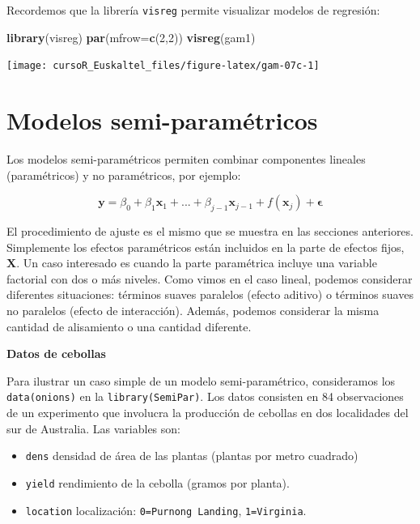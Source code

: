 \documentclass[]{book}
\newenvironment{Shaded}{\begin{snugshade}}{\end{snugshade}}
\newcommand{\KeywordTok}[1]{\textcolor[rgb]{0.13,0.29,0.53}{\textbf{#1}}}
\newcommand{\DataTypeTok}[1]{\textcolor[rgb]{0.13,0.29,0.53}{#1}}
\newcommand{\DecValTok}[1]{\textcolor[rgb]{0.00,0.00,0.81}{#1}}
\newcommand{\NormalTok}[1]{#1}
\begin{document}
Recordemos que la librería \texttt{visreg} permite visualizar modelos de
regresión:

\begin{Shaded}
\begin{Highlighting}[]
\KeywordTok{library}\NormalTok{(visreg)}
\KeywordTok{par}\NormalTok{(}\DataTypeTok{mfrow=}\KeywordTok{c}\NormalTok{(}\DecValTok{2}\NormalTok{,}\DecValTok{2}\NormalTok{))}
\KeywordTok{visreg}\NormalTok{(gam1)}
\end{Highlighting}
\end{Shaded}

\begin{center}\texttt{[image: cursoR\_Euskaltel\_files/figure-latex/gam-07c-1]} \end{center}

\section{Modelos semi-paramétricos}\label{modelos-semi-parametricos}

Los modelos semi-paramétricos permiten combinar componentes lineales
(paramétricos) y no paramétricos, por ejemplo:

\[
\boldsymbol{y} = \beta_0 + \beta_1\boldsymbol{x}_1 + ... + \beta_{j-1}\boldsymbol{x}_{j-1} + f(\boldsymbol{x}_j) + \boldsymbol{\epsilon}
\]

El procedimiento de ajuste es el mismo que se muestra en las secciones
anteriores. Simplemente los efectos paramétricos están incluidos en la
parte de efectos fijos, \(\boldsymbol{X}\). Un caso interesado es cuando
la parte paramétrica incluye una variable factorial con dos o más
niveles. Como vimos en el caso lineal, podemos considerar diferentes
situaciones: términos suaves paralelos (efecto aditivo) o términos
suaves no paralelos (efecto de interacción). Además, podemos considerar
la misma cantidad de alisamiento o una cantidad diferente.

\textbf{Datos de cebollas}

Para ilustrar un caso simple de un modelo semi-paramétrico, consideramos
los \texttt{data(onions)} en la \texttt{library(SemiPar)}. Los datos
consisten en 84 observaciones de un experimento que involucra la
producción de cebollas en dos localidades del sur de Australia. Las
variables son:

\begin{itemize}
\item
  \texttt{dens} densidad de área de las plantas (plantas por metro
  cuadrado)
\item
  \texttt{yield} rendimiento de la cebolla (gramos por planta).
\item
  \texttt{location} localización: \texttt{0=Purnong\ Landing},
  \texttt{1=Virginia}.
\end{itemize}
\end{document}
